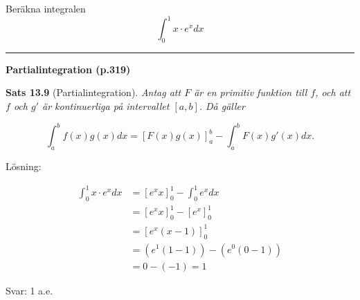 \documentclass[11pt]{article}
\begin{document}
Beräkna integralen
\[
    \int_0^1 x \cdot e^x dx
\]

\noindent\rule{\textwidth}{0.5pt}

\textbf{Partialintegration (p.319)}

\textbf{Sats 13.9} (Partialintegration). \textit{Antag att $F$ är en primitiv funktion till $f$, och att $f$ och $g'$ är kontinuerliga på intervallet $[a, b]$. Då gäller}

\begin{equation*}
    \int_a^b{f(x)g(x)}dx = \left [F(x)g(x)\right ]_a^b - \int_a^b{F(x)g'(x)}dx.
\end{equation*}

Lösning:

\begin{align*}
    \int_{0}^{1} x \cdot e^{x} dx &= \left[e^{x} x\right]_0^1 - \int_0^1 e^{x} dx \\
    &= \left[e^{x} x\right]_0^1 - \left[ e^x \right]_0^1 \\
    &= \left[e^x(x - 1)\right]_0^1 \\
    &= (e^1(1 - 1)) - (e^0(0 - 1)) \\
    &= 0 - (-1) = 1
\end{align*}

Svar: 1 a.e.
\end{document}
